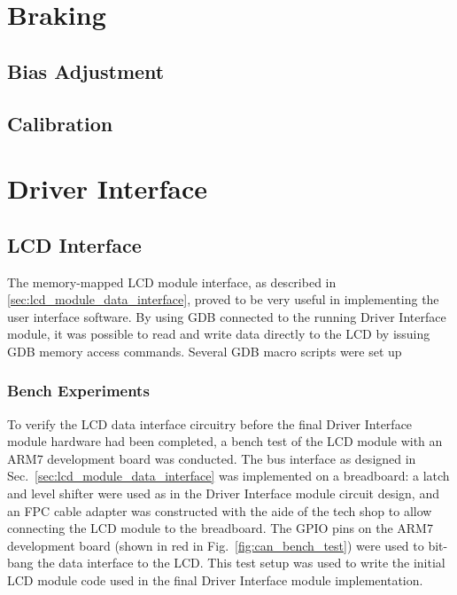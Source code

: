 \section{Braking}


\subsection{Bias Adjustment}


\subsection{Calibration}





\section{Driver Interface}







\subsection{LCD Interface}

The memory-mapped LCD module interface, as described in \ref{sec:lcd_module_data_interface}, proved to be very useful in implementing the user interface software. By using GDB connected to the running Driver Interface module, it was possible to read and write data directly to the LCD by issuing GDB memory access commands. Several GDB macro scripts were set up

\subsubsection{Bench Experiments}

To verify the LCD data interface circuitry before the final Driver Interface module hardware had been completed, a bench test of the LCD module with an ARM7 development board was conducted. The bus interface as designed in Sec.\ \ref{sec:lcd_module_data_interface} was implemented on a breadboard: a latch and level shifter were used as in the Driver Interface module circuit design, and an FPC cable adapter was constructed with the aide of the tech shop to allow connecting the LCD module to the breadboard. The GPIO pins on the ARM7 development board (shown in red in Fig.\ \ref{fig:can_bench_test}) were used to bit-bang the data interface to the LCD. This test setup was used to write the initial LCD module code used in the final Driver Interface module implementation.

